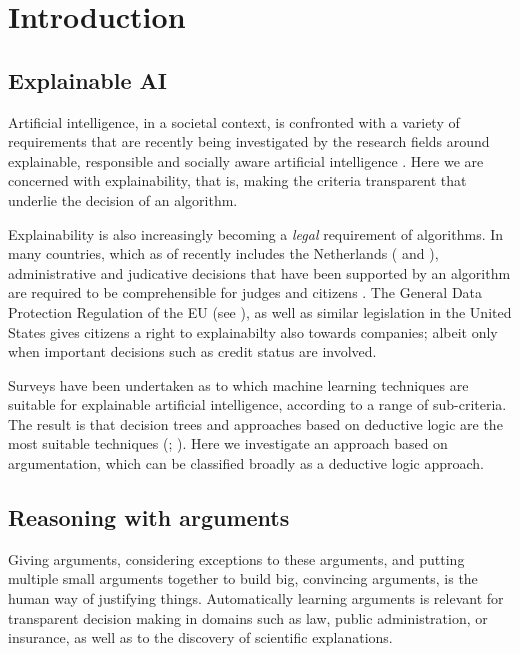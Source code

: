 \chapter{Introduction}\label{Introduction}

\section{Explainable AI}

Artificial intelligence, in a societal context, is confronted with a variety of requirements that are recently being investigated by the research fields around explainable, responsible and socially aware artificial intelligence \citep{specialinterestgrouponartificialintelligenceDutchArtificialIntelligence2018}. Here we are concerned with explainability, that is, making the criteria transparent that underlie the decision of an algorithm.

Explainability is also increasingly becoming a \textit{legal} requirement of algorithms. In many countries, which as of recently includes the Netherlands (\citet{raadvanstateECLINLRVS2017} and \citet{rechtbankdenhaagECLINLRBDHA2020}), administrative and judicative decisions that have been supported by an algorithm are required to be comprehensible for judges and citizens \citep{doshi-velezAccountabilityAILaw2019}. The General Data Protection Regulation of the EU (see \citet{goodmanEuropeanUnionRegulations2017}), as well as similar legislation in the United States gives citizens a right to explainabilty also towards companies; albeit only when important decisions such as credit status are involved.

Surveys have been undertaken as to which machine learning techniques are suitable for explainable artificial intelligence, according to a range of sub-criteria. The result is that decision trees and approaches based on deductive logic are the most suitable techniques (\cite{arrietaExplainableArtificialIntelligence2020}; \cite{waltlExplainableArtificialIntelligence2018}). Here we investigate an approach based on argumentation, which can be classified broadly as a deductive logic approach.

\section{Reasoning with arguments}

Giving arguments, considering exceptions to these arguments, and putting multiple small arguments together to build big, convincing arguments, is the human way of justifying things. Automatically learning arguments is relevant for transparent decision making in domains such as law, public administration, or insurance, as well as to the discovery of scientific explanations. 


